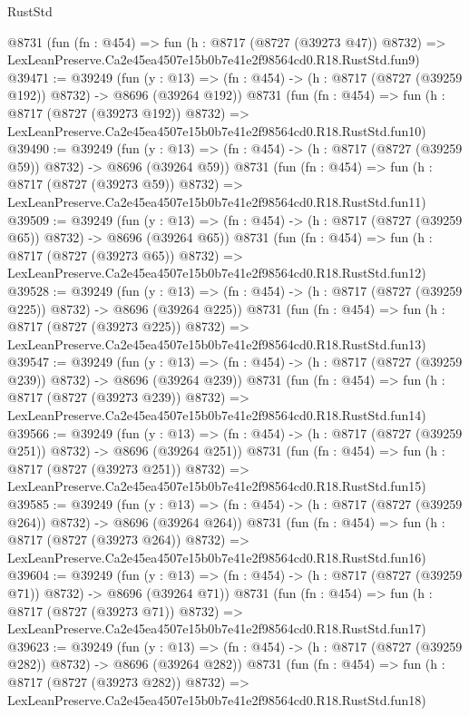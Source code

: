 \begin{lexlean}{RustStd}
\begin{coremodule}
    @8731
    (fun (fn : @454) =>
    fun (h : @8717 (@8727 (@39273 @47)) @8732) =>
    LexLeanPreserve.Ca2e45ea4507e15b0b7e41e2f98564cd0.R18.RustStd.fun9)
@39471 := @39249
    (fun (y : @13) => (fn : @454) -> (h : @8717 (@8727 (@39259 @192)) @8732) -> @8696 (@39264 @192))
    @8731
    (fun (fn : @454) =>
    fun (h : @8717 (@8727 (@39273 @192)) @8732) =>
    LexLeanPreserve.Ca2e45ea4507e15b0b7e41e2f98564cd0.R18.RustStd.fun10)
@39490 := @39249
    (fun (y : @13) => (fn : @454) -> (h : @8717 (@8727 (@39259 @59)) @8732) -> @8696 (@39264 @59))
    @8731
    (fun (fn : @454) =>
    fun (h : @8717 (@8727 (@39273 @59)) @8732) =>
    LexLeanPreserve.Ca2e45ea4507e15b0b7e41e2f98564cd0.R18.RustStd.fun11)
@39509 := @39249
    (fun (y : @13) => (fn : @454) -> (h : @8717 (@8727 (@39259 @65)) @8732) -> @8696 (@39264 @65))
    @8731
    (fun (fn : @454) =>
    fun (h : @8717 (@8727 (@39273 @65)) @8732) =>
    LexLeanPreserve.Ca2e45ea4507e15b0b7e41e2f98564cd0.R18.RustStd.fun12)
@39528 := @39249
    (fun (y : @13) => (fn : @454) -> (h : @8717 (@8727 (@39259 @225)) @8732) -> @8696 (@39264 @225))
    @8731
    (fun (fn : @454) =>
    fun (h : @8717 (@8727 (@39273 @225)) @8732) =>
    LexLeanPreserve.Ca2e45ea4507e15b0b7e41e2f98564cd0.R18.RustStd.fun13)
@39547 := @39249
    (fun (y : @13) => (fn : @454) -> (h : @8717 (@8727 (@39259 @239)) @8732) -> @8696 (@39264 @239))
    @8731
    (fun (fn : @454) =>
    fun (h : @8717 (@8727 (@39273 @239)) @8732) =>
    LexLeanPreserve.Ca2e45ea4507e15b0b7e41e2f98564cd0.R18.RustStd.fun14)
@39566 := @39249
    (fun (y : @13) => (fn : @454) -> (h : @8717 (@8727 (@39259 @251)) @8732) -> @8696 (@39264 @251))
    @8731
    (fun (fn : @454) =>
    fun (h : @8717 (@8727 (@39273 @251)) @8732) =>
    LexLeanPreserve.Ca2e45ea4507e15b0b7e41e2f98564cd0.R18.RustStd.fun15)
@39585 := @39249
    (fun (y : @13) => (fn : @454) -> (h : @8717 (@8727 (@39259 @264)) @8732) -> @8696 (@39264 @264))
    @8731
    (fun (fn : @454) =>
    fun (h : @8717 (@8727 (@39273 @264)) @8732) =>
    LexLeanPreserve.Ca2e45ea4507e15b0b7e41e2f98564cd0.R18.RustStd.fun16)
@39604 := @39249
    (fun (y : @13) => (fn : @454) -> (h : @8717 (@8727 (@39259 @71)) @8732) -> @8696 (@39264 @71))
    @8731
    (fun (fn : @454) =>
    fun (h : @8717 (@8727 (@39273 @71)) @8732) =>
    LexLeanPreserve.Ca2e45ea4507e15b0b7e41e2f98564cd0.R18.RustStd.fun17)
@39623 := @39249
    (fun (y : @13) => (fn : @454) -> (h : @8717 (@8727 (@39259 @282)) @8732) -> @8696 (@39264 @282))
    @8731
    (fun (fn : @454) =>
    fun (h : @8717 (@8727 (@39273 @282)) @8732) =>
    LexLeanPreserve.Ca2e45ea4507e15b0b7e41e2f98564cd0.R18.RustStd.fun18)

\end{coremodule}
\end{lexlean}
